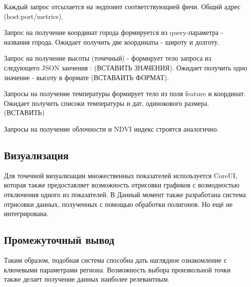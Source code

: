 Каждый запрос отсылается на эндпоинт соответствующией фичи. Общий адрес (host:port/metrics). 

Запрос на получение координат города формируется из query-параметра - названия города. Ожидает получить две координаты - широту и долготу.

Запрос на получение высоты (точечный) - формирует тело запроса из следующего JSON занчения : (ВСТАВИТЬ ЗНАЧЕНИЯ). Ожидает получить одно значение - высоту в формате (ВСТАВАИТЬ ФОРМАТ).

Запросы на получение температуры формирует тело из поля feature  и координат. Ожидает получить списоки температуры и дат, одинокового размера. (ВСТАВИТЬ)

Запросы на получение облочности и NDVI индекс строятся аналогично.

\subsection*{Визуализация}
Для точечной визуализации множественных показателей используется CoreUI, которая также предоставляет возможность отрисовки графиков с возмодностью отключения одного из показателей.
В Данный момент также разработана система отрисовки данных, полученных с помощью обработки полигонов. Но ещё не интегрирована.

\subsection*{Промежуточный вывод}
Таким образом, подобная система способна дать наглядное ознакомление с ключевыми параметрами региона. 
Возможность выбора произвольной точки также делает получение данных наиболее релевантным.